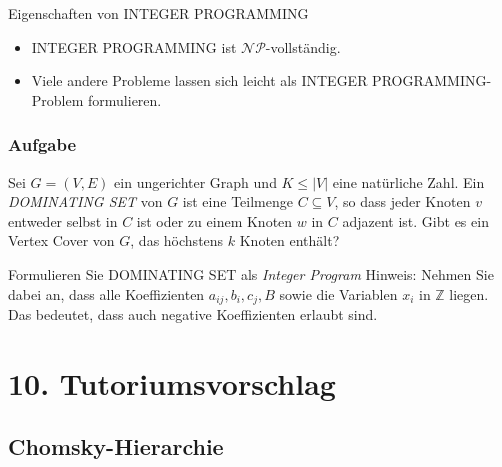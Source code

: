 \documentclass{beamer}
\begin{document}
{\begin{frame}
 \begin{block}{Eigenschaften von INTEGER PROGRAMMING}
 \begin{itemize}
  \item INTEGER PROGRAMMING ist $\mathcal{NP}$-vollständig.
  \item Viele andere Probleme lassen sich leicht als INTEGER PROGRAMMING-Problem formulieren.
 \end{itemize}
 \end{block}
\end{frame}

\begin{frame}
\frametitle{Aufgabe}
Sei $G=(V, E)$ ein ungerichter Graph und $K \leq |V|$ eine natürliche Zahl. 
Ein \emph{DOMINATING SET} von $G$ ist eine Teilmenge $C \subseteq V$, so dass jeder Knoten $v$ entweder selbst in $C$ ist oder zu einem Knoten $w$ in $C$ adjazent ist. 
Gibt es ein Vertex Cover von $G$, das höchstens $k$ Knoten enthält?

Formulieren Sie DOMINATING SET als \emph{Integer Program} 
Hinweis: Nehmen Sie dabei an, dass alle Koeffizienten $a_{ij}, b_i, c_j, B$ sowie die Variablen $x_i$ in $\mathbb{Z}$ liegen. Das bedeutet, dass auch negative Koeffizienten erlaubt sind.  
\end{frame}

\section{10. Tutoriumsvorschlag}
\subsection{Chomsky-Hierarchie}

}
\end{document}
